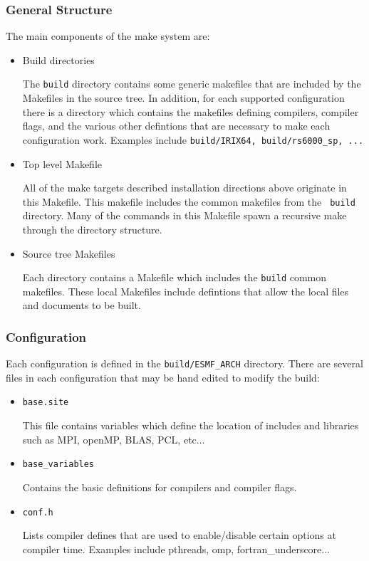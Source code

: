\subsubsection{General Structure}
The main components of the make system are:
\begin{itemize}
\item{Build directories}

The {\tt build} directory contains some generic makefiles that are included by
the Makefiles in the source tree.  In addition, for each supported
configuration there is a directory which contains the makefiles defining
compilers, compiler flags, and the various other defintions that are necessary
to make each configuration work.  Examples include {\tt build/IRIX64,
build/rs6000\_sp, ...}

\item{Top level Makefile}

All of the make targets described installation directions above originate in
this Makefile.  This makefile includes the common makefiles from the {\tt
build} directory.  Many of the commands in this Makefile spawn a recursive make
through the directory structure.

\item{Source tree Makefiles}

Each directory contains a Makefile which includes the {\tt build} common
makefiles.  These local Makefiles include defintions that allow the local files
and documents to be built.
\end{itemize}

\subsubsection{Configuration}

Each configuration is defined in the {\tt build/ESMF\_ARCH} directory.  There
are several files in each configuration that may be hand edited to modify the
build:

\begin{itemize}

\item{{\tt base.site}}

This file contains variables which define the location of includes and
libraries such as MPI, openMP, BLAS, PCL, etc...

\item{{\tt base\_variables}}

Contains the basic definitions for compilers and compiler flags.

\item{{\tt conf.h}}

Lists compiler defines that are used to enable/disable certain options at
compiler time.  Examples include pthreads, omp, fortran\_underscore...

\end{itemize}
